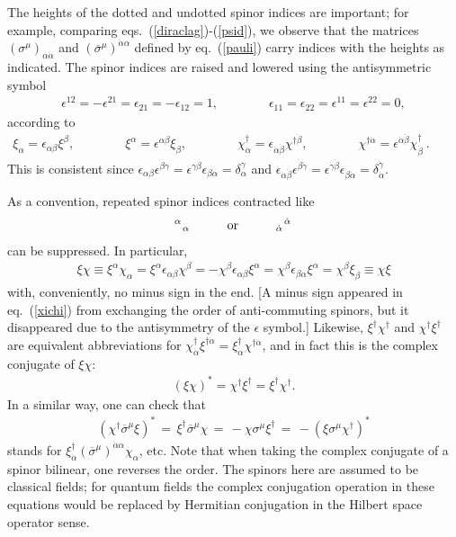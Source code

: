 \documentclass[12pt]{article}
\def\beq{\begin{eqnarray}}
\def\eeq{\end{eqnarray}}
\def\sigmabar{\overline\sigma}
\begin{document}
The heights of the dotted and undotted spinor indices are important; for
example, comparing eqs.~(\ref{diraclag})-(\ref{psid}), we observe that the
matrices $(\sigma^\mu)_{\alpha\dot{\alpha}}$ and
$(\sigmabar^\mu)^{\dot{\alpha}\alpha}$ defined by eq.~(\ref{pauli}) carry
indices with the heights as indicated. The spinor indices are raised and
lowered using the antisymmetric symbol 
\beq
\epsilon^{12} = -\epsilon^{21} =
\epsilon_{21} = -\epsilon_{12} = 1, \qquad\qquad \epsilon_{11} = \epsilon_{22} =
\epsilon^{11} = \epsilon^{22} = 0,
\label{eq:defepstwo}
\eeq 
according to
\beq
\xi_\alpha = \epsilon_{\alpha\beta}
\xi^\beta,\qquad\qquad\!\!\!\!\!\!\!\!\!
\xi^\alpha = \epsilon^{\alpha\beta}
\xi_\beta,\qquad\qquad\!\!\!\!\!\!\!\!\!
\chi^\dagger_{\dot{\alpha}} = \epsilon_{\dot{\alpha}\dot{\beta}}
\chi^{\dagger\dot{\beta}},\qquad\qquad\!\!\!\!\!\!\!\!\!
\chi^{\dagger\dot{\alpha}} = \epsilon^{\dot{\alpha}\dot{\beta}}
\chi^\dagger_{\dot{\beta}}\>.\qquad{}
\eeq
This is consistent since
$\epsilon_{\alpha\beta} \epsilon^{\beta\gamma} =
\epsilon^{\gamma\beta}\epsilon_{\beta\alpha} = \delta_\alpha^\gamma$
and
$\epsilon_{\dot{\alpha}\dot{\beta}} \epsilon^{\dot{\beta}\dot{\gamma}} =
\epsilon^{\dot{\gamma}\dot{\beta}}\epsilon_{\dot{\beta}\dot{\alpha}} =
\delta_{\dot{\alpha}}^{\dot{\gamma}}$.

\vspace{0.1cm}

As a convention, repeated spinor indices contracted like 
\beq
{}^\alpha\hspace{0.03cm}{}_\alpha \qquad\quad \mbox{or} 
\qquad\quad 
{}_{\dot{\alpha}}\hspace{0.03cm}{}^{\dot{\alpha}}\, 
\eeq 
can be suppressed.
In particular,
\beq
\xi\chi \equiv \xi^\alpha\chi_\alpha = \xi^\alpha \epsilon_{\alpha\beta}
\chi^\beta = -\chi^\beta \epsilon_{\alpha\beta} \xi^\alpha =
\chi^\beta \epsilon_{\beta\alpha} \xi^\alpha = \chi^\beta \xi_\beta \equiv
\chi\xi
\label{xichi}
\eeq
with, conveniently, no minus sign in the end. [A minus sign appeared in
eq.~(\ref{xichi}) from exchanging the order of anti-commuting spinors, but
it disappeared due to the antisymmetry of the $\epsilon$ symbol.]
Likewise, $\xi^\dagger \chi^\dagger$ and $\chi^\dagger \xi^\dagger $ are
equivalent abbreviations for $\chi^\dagger_{\dot{\alpha}} \xi^{\dagger
\dot{\alpha}} = \xi^\dagger_{\dot{\alpha}} \chi^{\dagger \dot{\alpha}}$,
and in fact this is the complex conjugate of $\xi\chi$: 
\beq
(\xi\chi)^* = \chi^\dagger \xi^\dagger = \xi^\dagger \chi^\dagger.
\eeq
In a similar way, one can check that
\beq
(\chi^\dagger \sigmabar^\mu \xi)^* \,=\, 
\xi^\dagger \sigmabar^\mu \chi \,=\, -\chi \sigma^\mu \xi^\dagger
\,=\,
 -(\xi\sigma^\mu\chi^\dagger)^*
\label{yetanotheridentity}
\eeq
stands for $\xi^\dagger_{\dot{\alpha}}(\sigmabar^\mu)^{\dot{\alpha}\alpha}
\chi_\alpha$, etc. Note that when taking the complex conjugate of a spinor bilinear,
one reverses the order. The spinors here are assumed to be
classical fields; for quantum fields the complex conjugation operation in these 
equations would be replaced by Hermitian conjugation in the Hilbert
space operator sense. 
\end{document}
